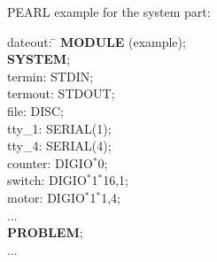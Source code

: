 \begin{removed}
PEARL example for the system part:

\begin{tabbing}
\x dateout: \= \kill
{\bf MODULE} (example); \> \\
{\bf SYSTEM}; \> \\
\x termin:  \> STDIN; \\
\x termout: \> STDOUT;\\
\x file:    \> DISC;  \\
\x tty\_1:  \> SERIAL(1);\\
\x tty\_4:  \> SERIAL(4);\\
\x counter: \> DIGIO$^*$0; \\
\x switch:  \> DIGIO$^*$1$^*$16,1; \\
\x motor:   \> DIGIO$^*$1$^*$1,4;  \\
\x ... \> \\
{\bf PROBLEM};\> \\
\x ... \>
\end{tabbing}
\end{removed}

